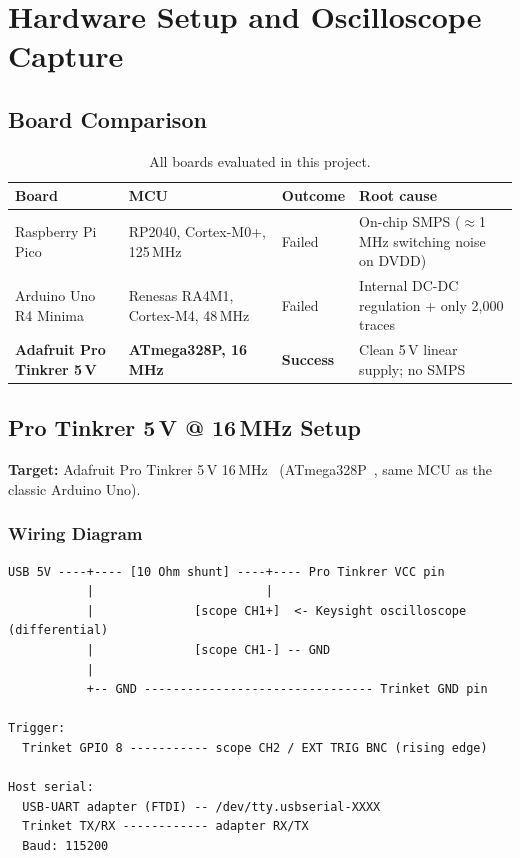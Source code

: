 \section{Hardware Setup and Oscilloscope Capture}
\label{app:hw}

\subsection{Board Comparison}

\begin{table}[H]
\centering
\caption{All boards evaluated in this project.}
\begin{tabular}{@{}p{4.2cm}p{3.5cm}p{2.3cm}p{4cm}@{}}
\toprule
Board & MCU & Outcome & Root cause \\
\midrule
Raspberry Pi Pico & RP2040, Cortex-M0+, 125\,MHz & Failed &
  On-chip SMPS ($\approx$1\,MHz switching noise on DVDD) \\
Arduino Uno R4 Minima & Renesas RA4M1, Cortex-M4, 48\,MHz & Failed &
  Internal DC-DC regulation + only 2{,}000 traces \\
\textbf{Adafruit Pro Tinkrer 5\,V} & \textbf{ATmega328P, 16\,MHz} &
  \textbf{Success} & Clean 5\,V linear supply; no SMPS \\
\bottomrule
\end{tabular}
\end{table}

\subsection{Pro Tinkrer 5\,V @ 16\,MHz Setup}
\label{app:hw:trinket}

\textbf{Target:} Adafruit Pro Tinkrer 5\,V 16\,MHz~\cite{adafruit_trinket_pro}
(ATmega328P~\cite{atmega328p}, same MCU as the classic Arduino Uno).

\subsubsection*{Wiring Diagram}

\begin{verbatim}
USB 5V ----+---- [10 Ohm shunt] ----+---- Pro Tinkrer VCC pin
           |                        |
           |              [scope CH1+]  <- Keysight oscilloscope (differential)
           |              [scope CH1-] -- GND
           |
           +-- GND -------------------------------- Trinket GND pin

Trigger:
  Trinket GPIO 8 ----------- scope CH2 / EXT TRIG BNC (rising edge)

Host serial:
  USB-UART adapter (FTDI) -- /dev/tty.usbserial-XXXX
  Trinket TX/RX ------------ adapter RX/TX
  Baud: 115200
\end{verbatim}

